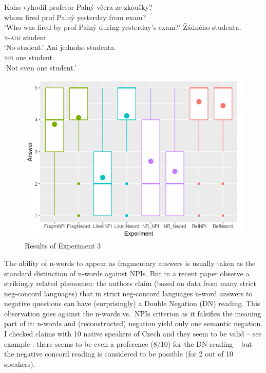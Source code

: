 \documentclass[output=paper,
]{langscibook}
\begin{document}
\ea \label{ex-35} \gll Koho vyhodil profesor Palný včera ze zkoušky?\\
whom fired prof Palný yesterday from exam?\\
\glt `Who was fired by prof Palný during yesterday's exam?'
\ea \gll Žádného studenta.\\
\textsc{n-adj} student\\
\glt `No student.'
\ex \gll Ani jednoho studenta.\\
\textsc{npi} one student\\
\glt `Not even one student.'
\z
\z

\begin{figure}
\centering
\includegraphics[scale=0.8]{figures/Rplot04.png}
\caption{Results of Experiment 3}\label{fig:exp3}
\end{figure}

\noindent The ability of n-words to appear as fragmentary answers is usually taken as the standard distinction of n-words against NPIs. But in a recent paper  \cite{fualuaus2016fragment} observe a strikingly related phenomen: the authors claim (based on data from many strict neg-concord languages) that in strict neg-concord languages n-word answers to negative questions can have (surprisingly) a Double Negation (DN) reading. This observation goes against the n-words vs.~NPIs criterion as it falsifies the meaning part of it: n-words and (reconstructed) negation yield only one semantic negation. I checked  claims with 10 native speakers of Czech and they seem to be valid -- see example : there seems to be even a preference (8/10) for the DN reading --  but the negative concord reading  is considered to be possible (for 2 out of 10 speakers).
\end{document}
